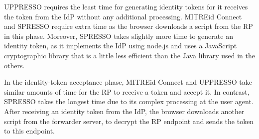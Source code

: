 UPPRESSO requires the least time for generating identity tokens for it receives the token from the IdP without any additional processing.
MITREid Connect and SPRESSO require extra time as the browser downloads a script from the RP in this phase. %
Moreover, SPRESSO takes slightly more time to generate an identity token, as it implements the IdP using node.js and uses a JavaScript cryptographic library that is a little less efficient than the Java library used in the others.

In the identity-token acceptance phase, 
MITREid Connect and UPPRESSO take similar amounts of time for the RP to receive a token and accept it.
In contrast, SPRESSO takes the longest time due to its complex processing at the user agent.
After receiving an identity token from the IdP, the browser downloads another script from the forwarder server, to decrypt the RP endpoint and sends the token to this endpoint.

